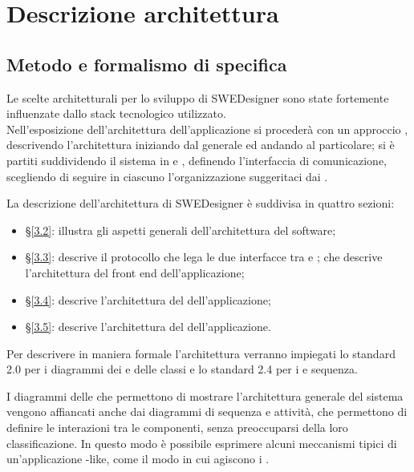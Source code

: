 \section{Descrizione architettura }
	\subsection{Metodo e formalismo di specifica}
Le scelte architetturali per lo sviluppo di SWEDesigner sono state fortemente influenzate dallo stack tecnologico utilizzato. \\

Nell’esposizione dell’architettura dell'applicazione si procederà con un approccio , descrivendo l'architettura iniziando dal generale ed andando al particolare; si è partiti suddividendo il sistema in  e , definendo l'interfaccia di comunicazione, scegliendo di seguire in ciascuno l'organizzazione suggeritaci dai . 

La descrizione dell’architettura di SWEDesigner è suddivisa in quattro sezioni:
\begin{itemize}
\item \S\ref{3.2}: illustra gli aspetti generali dell’architettura del software;
\item \S\ref{3.3}: descrive il protocollo che lega le due interfacce tra  e ;
che descrive l’architettura del front end dell’applicazione;
\item \S\ref{3.4}: descrive l’architettura del  dell’applicazione;
\item \S\ref{3.5}: descrive l’architettura del  dell’applicazione.

\end{itemize}

Per descrivere in maniera formale l'architettura verranno impiegati lo standard  2.0 per i diagrammi dei  e delle classi e lo standard  2.4 per i  e sequenza.

I diagrammi delle  che permettono di mostrare l'architettura generale del sistema vengono affiancati anche dai diagrammi di sequenza e attività, che permettono di definire le interazioni tra le componenti, senza preoccuparsi della loro classificazione.
In questo modo è possibile esprimere alcuni meccanismi tipici di un’applicazione
-like, come il modo in cui agiscono i .

